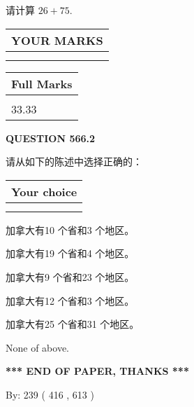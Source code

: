 \documentclass{ctexart}
\begin{document}
  
 
请计算 $ %
26 +  %
75 $.
 

 

 
  
\vspace{0.2in}
  
\noindent\begin{tabular}{|l|}
\hline
 YOUR MARKS  \\
\hline
 \\ 
 \\ 
\hline
\end{tabular}
\hspace{0.05in} \begin{tabular}{|l|}
\hline
 Full Marks  \\
\hline
 \\ 
33.33 \\
\hline
\end{tabular}
{\textbf{\Large{QUESTION
566.2 
}}}
  
  
请从如下的陈述中选择正确的：
  
  
\noindent\hspace{3.0in} \begin{tabular}{|l|}
\hline
Your choice \\
\hline
 \\ 
 \\ 
\hline
\end{tabular}
  
  
 
 
加拿大有10 个省和3 个地区。
 
 
加拿大有19 个省和4 个地区。
 
 
加拿大有9 个省和23 个地区。
 
 
加拿大有12 个省和3 个地区。
 
 
加拿大有25 个省和31 个地区。
 
 
 None of above.
 
 
   
   
 \vspace{0.2in}
 
   
   
   
   
\vspace{1.0in} 
{\textbf{\large{ *** END OF PAPER, THANKS *** }}} 
   
   
\hspace{1.0in} By: 
 239 ( 416 ,  613 )
   
\end{document}
